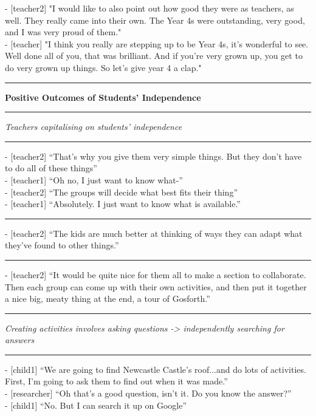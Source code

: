- [teacher2] "I would like to also point out how good they were as teachers, as well. They really came into their own. The Year 4s were outstanding, very good, and I was very proud of them."\\ 
- [teacher] "I think you really are stepping up to be Year 4s, it's wonderful to see. Well done all of you, that was brilliant. And if you're very grown up, you get to do very grown up things. So let's give year 4 a clap."


\par\noindent\rule{\textwidth}{1pt}

\textbf{Positive Outcomes of Students’ Independence}

\par\noindent\rule{\textwidth}{1pt}

\textit{Teachers capitalising on students' independence}

\par\noindent\rule{\textwidth}{1pt}

- [teacher2] “That’s why you give them very simple things. But they don’t have to do all of these things”\\
- [teacher1] “Oh no, I just want to know what-”\\
- [teacher2] “The groups will decide what best fits their thing”\\
- [teacher1] “Absolutely. I just want to know what is available.”

{\centering
  \noindent\rule{0.5\textwidth}{0.4pt}\par
}

- [teacher2] “The kids are much better at thinking of ways they can adapt what they've found to other things.”

{\centering
  \noindent\rule{0.5\textwidth}{0.4pt}\par
}

- [teacher2] “It would be quite nice for them all to make a section to collaborate.  Then each group can come up with their own activities, and then put it together a nice big, meaty thing at the end, a tour of Gosforth.”

\par\noindent\rule{\textwidth}{1pt}

\textit{Creating activities involves asking questions -> independently searching for answers}

\par\noindent\rule{\textwidth}{1pt}

- [child1] “We are going to find Newcastle Castle’s roof...and do lots of activities. First, I’m going to ask them to find out when it was made.”\\
- [researcher] “Oh that’s a good question, isn’t it. Do you know the answer?”\\
- [child1] “No. But I can search it up on Google”\\

